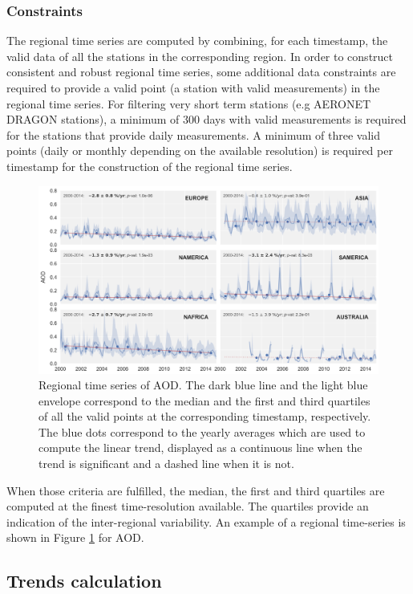 \documentclass[journal abbreviation, manuscript]{copernicus}
\begin{document}
\subsubsection{Constraints}
The regional time series are computed by combining, for each timestamp, the valid data of all the stations in the corresponding region. In order to construct consistent and robust regional time series, some additional data constraints are required to provide a valid point (a station with valid measurements) in the regional time series. For filtering very short term stations (e.g AERONET DRAGON stations), a minimum of 300 days with valid measurements is required for the stations that provide daily measurements. A minimum of three valid points (daily or monthly depending on the available resolution) is required per timestamp for the construction of the regional time series.

\begin{figure}
 \includegraphics[width=16cm]{../scripts/figs/ts/panel-od550aer.png}
 \caption{Regional time series of AOD. The dark blue line and the light blue envelope correspond to the median and the first and third quartiles of all the valid points at the corresponding timestamp, respectively. The blue dots correspond to the yearly averages which are used to compute the linear trend, displayed as a continuous line when the trend is significant and a dashed line when it is not.}
 \label{fig:ts_aod}
\end{figure}

When those criteria are fulfilled, the median, the first and third quartiles are computed at the finest time-resolution available. The quartiles provide an indication of the inter-regional variability. An example of a regional time-series is shown in Figure \ref{fig:ts_aod} for AOD.


\subsection{Trends calculation}
\end{document}
